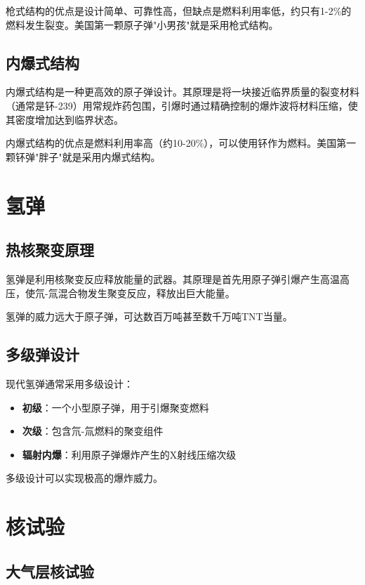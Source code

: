 \documentclass[12pt,UTF8]{ctexbook}
\begin{document}
枪式结构的优点是设计简单、可靠性高，但缺点是燃料利用率低，约只有1-2\%的燃料发生裂变。美国第一颗原子弹"小男孩"就是采用枪式结构。

\section{内爆式结构}

内爆式结构是一种更高效的原子弹设计。其原理是将一块接近临界质量的裂变材料（通常是钚-239）用常规炸药包围，引爆时通过精确控制的爆炸波将材料压缩，使其密度增加达到临界状态。

内爆式结构的优点是燃料利用率高（约10-20\%），可以使用钚作为燃料。美国第一颗钚弹"胖子"就是采用内爆式结构。

\chapter{氢弹}

\section{热核聚变原理}

氢弹是利用核聚变反应释放能量的武器。其原理是首先用原子弹引爆产生高温高压，使氘-氚混合物发生聚变反应，释放出巨大能量。

氢弹的威力远大于原子弹，可达数百万吨甚至数千万吨TNT当量。

\section{多级弹设计}

现代氢弹通常采用多级设计：

\begin{itemize}[leftmargin=2cm]
    \item \textbf{初级}：一个小型原子弹，用于引爆聚变燃料
    \item \textbf{次级}：包含氘-氚燃料的聚变组件
    \item \textbf{辐射内爆}：利用原子弹爆炸产生的X射线压缩次级
\end{itemize}

多级设计可以实现极高的爆炸威力。

\chapter{核试验}

\section{大气层核试验}
\end{document}
